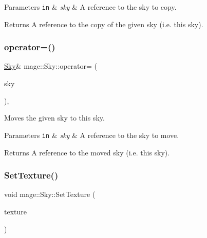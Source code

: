 \begin{DoxyParams}[1]{Parameters}
\mbox{\tt in}  & {\em sky} & A reference to the sky to copy. \\
\hline
\end{DoxyParams}
\begin{DoxyReturn}{Returns}
A reference to the copy of the given sky (i.\+e. this sky). 
\end{DoxyReturn}
\hypertarget{classmage_1_1_sky_a049fa5006b4afc50ad3fe29702815d35}{}\label{classmage_1_1_sky_a049fa5006b4afc50ad3fe29702815d35} 
\subsubsection{\texorpdfstring{operator=()}{operator=()}\hspace{0.1cm}{\footnotesize\ttfamily [2/2]}}
{\footnotesize\ttfamily \hyperlink{classmage_1_1_sky}{Sky}\& mage\+::\+Sky\+::operator= (\begin{DoxyParamCaption}\item[{\hyperlink{classmage_1_1_sky}{Sky} \&\&}]{sky }\end{DoxyParamCaption})\hspace{0.3cm}{\ttfamily [default]}, {\ttfamily [noexcept]}}

Moves the given sky to this sky.


\begin{DoxyParams}[1]{Parameters}
\mbox{\tt in}  & {\em sky} & A reference to the sky to move. \\
\hline
\end{DoxyParams}
\begin{DoxyReturn}{Returns}
A reference to the moved sky (i.\+e. this sky). 
\end{DoxyReturn}
\hypertarget{classmage_1_1_sky_aceb336c88ac33bb8490987812414578c}{}\label{classmage_1_1_sky_aceb336c88ac33bb8490987812414578c} 
\subsubsection{\texorpdfstring{Set\+Texture()}{SetTexture()}}
{\footnotesize\ttfamily void mage\+::\+Sky\+::\+Set\+Texture (\begin{DoxyParamCaption}\item[{const \hyperlink{namespacemage_a1e01ae66713838a7a67d30e44c67703e}{Shared\+Ptr}$<$ const \hyperlink{classmage_1_1_texture}{Texture} $>$ \&}]{texture }\end{DoxyParamCaption})}

